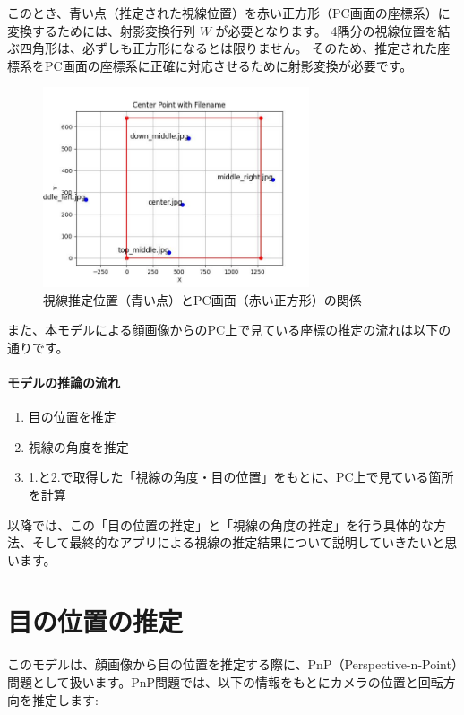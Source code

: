 このとき、青い点（推定された視線位置）を赤い正方形（PC画面の座標系）に変換するためには、射影変換行列 $W$ が必要となります。  
4隅分の視線位置を結ぶ四角形は、必ずしも正方形になるとは限りません。  
そのため、推定された座標系をPC画面の座標系に正確に対応させるために射影変換が必要です。

\begin{figure}[htbp]
    \centering
    \includegraphics[width=0.7\textwidth]{eye-track-cursor/fig/coordinate.png}
    \caption{視線推定位置（青い点）とPC画面（赤い正方形）の関係}
    \label{fig:coordinate}
\end{figure}

また、本モデルによる顔画像からのPC上で見ている座標の推定の流れは以下の通りです。

\paragraph{モデルの推論の流れ}
\begin{enumerate}
    \item 目の位置を推定
    \item 視線の角度を推定
    \item 1.と2.で取得した「視線の角度・目の位置」をもとに、PC上で見ている箇所を計算
\end{enumerate}

以降では、この「目の位置の推定」と「視線の角度の推定」を行う具体的な方法、そして最終的なアプリによる視線の推定結果について説明していきたいと思います。

\section{目の位置の推定}\label{sec:eye-position}
このモデルは、顔画像から目の位置を推定する際に、PnP（Perspective-n-Point）問題として扱います。PnP問題では、以下の情報をもとにカメラの位置と回転方向を推定します:

